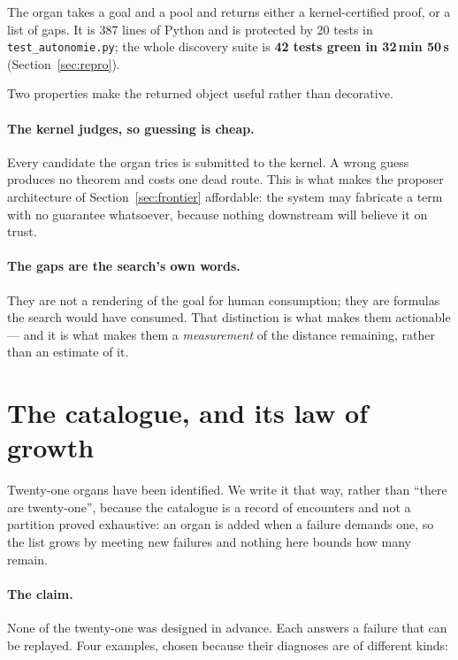 \documentclass[11pt]{article}
\theoremstyle{remark}\newtheorem{remark}{Remark}
\begin{document}
The organ takes a goal and a pool and returns either a kernel-certified proof, or a list
of gaps. It is 387 lines of Python and is protected by 20 tests in
\texttt{test\_autonomie.py}; the whole discovery suite is \textbf{42 tests green in
32\,min 50\,s} (Section~\ref{sec:repro}).

Two properties make the returned object useful rather than decorative.

\paragraph{The kernel judges, so guessing is cheap.} Every candidate the organ tries is
submitted to the kernel. A wrong guess produces no theorem and costs one dead route. This
is what makes the proposer architecture of Section~\ref{sec:frontier} affordable: the
system may fabricate a term with no guarantee whatsoever, because nothing downstream will
believe it on trust.

\paragraph{The gaps are the search's own words.} They are not a rendering of the goal for
human consumption; they are formulas the search would have consumed. That distinction is
what makes them actionable --- and it is what makes them a \emph{measurement} of the
distance remaining, rather than an estimate of it.

\section{The catalogue, and its law of growth}
\label{sec:catalogue}

Twenty-one organs have been identified. We write it that way, rather than ``there are
twenty-one'', because the catalogue is a record of encounters and not a partition proved
exhaustive: an organ is added when a failure demands one, so the list grows by meeting
new failures and nothing here bounds how many remain.

\paragraph{The claim.} None of the twenty-one was designed in advance. Each answers a
failure that can be replayed. Four examples, chosen because their diagnoses are of
different kinds:
\end{document}
